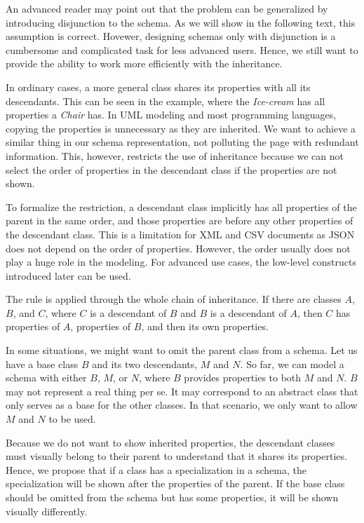 \medskip

An advanced reader may point out that the problem can be generalized by introducing disjunction to the schema. As we will show in the following text, this assumption is correct. Hovewer, designing schemas only with disjunction is a cumbersome and complicated task for less advanced users. Hence, we still want to provide the ability to work more efficiently with the inheritance.

In ordinary cases, a more general class shares its properties with all its descendants. This can be seen in the example, where the \textit{Ice-cream} has all properties a \textit{Chair} has. In UML modeling and most programming languages, copying the properties is unnecessary as they are inherited. We want to achieve a similar thing in our schema representation, not polluting the page with redundant information. This, however, restricts the use of inheritance because we can not select the order of properties in the descendant class if the properties are not shown.

To formalize the restriction, a descendant class implicitly has all properties of the parent in the same order, and those properties are before any other properties of the descendant class. This is a limitation for XML and CSV documents as JSON does not depend on the order of properties. However, the order usually does not play a huge role in the modeling. For advanced use cases, the low-level constructs introduced later can be used.

The rule is applied through the whole chain of inheritance. If there are classes $A$, $B$, and $C$, where $C$ is a descendant of $B$ and $B$ is a descendant of $A$, then $C$ has properties of $A$, properties of $B$, and then its own properties.

In some situations, we might want to omit the parent class from a schema. Let us have a base class $B$ and its two descendants, $M$ and $N$. So far, we can model a schema with either $B$, $M$, or $N$, where $B$ provides properties to both $M$ and $N$. $B$ may not represent a real thing per se. It may correspond to an abstract class that only serves as a base for the other classes. In that scenario, we only want to allow $M$ and $N$ to be used.

\medskip

Because we do not want to show inherited properties, the descendant classes must visually belong to their parent to understand that it shares its properties. Hence, we propose that if a class has a specialization in a schema, the specialization will be shown after the properties of the parent. If the base class should be omitted from the schema but has some properties, it will be shown visually differently.

